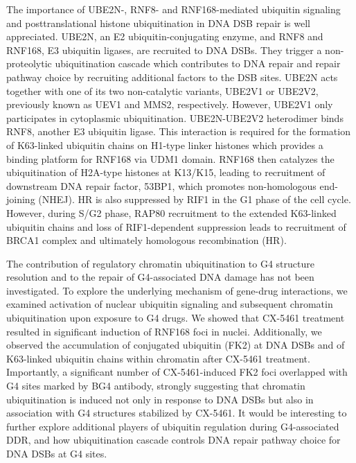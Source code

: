 The importance of UBE2N-, RNF8- and RNF168-mediated ubiquitin signaling and posttranslational histone ubiquitination in DNA DSB repair is well appreciated.  UBE2N, an E2 ubiquitin-conjugating enzyme, and RNF8 and RNF168, E3 ubiquitin ligases, are recruited to DNA DSBs\cite{Kolas2007,Mailand2007,Huen2008,Stewart2009}. 
They trigger a non-proteolytic ubiquitination cascade which contributes to DNA repair and repair pathway choice by recruiting additional factors to the DSB sites. UBE2N acts together with one of its two non-catalytic variants, UBE2V1 or UBE2V2, previously known as UEV1 and MMS2, respectively\cite{Hofmann1999a,Hodge2016c}. However, UBE2V1 only participates in cytoplasmic ubiquitination. UBE2N-UBE2V2 heterodimer binds RNF8, another E3 ubiquitin ligase. This interaction is required for the formation of K63-linked ubiquitin chains on H1-type linker histones which provides a binding platform for RNF168 via UDM1 domain\cite{Hofmann2001,Eddins2006,Kolas2007,Campbell2012,Thorslund2015}. RNF168 then catalyzes the ubiquitination of H2A-type histones at K13/K15, leading to recruitment of downstream DNA repair factor, 53BP1, which promotes non-homologous end-joining (NHEJ)\cite{Gatti2012a,Mattiroli2012,Fradet-Turcotte2013a}. HR is also suppressed by RIF1 in the G1 phase of the cell cycle. However, during S/G2 phase, RAP80 recruitment to the extended K63-linked ubiquitin chains and loss of RIF1-dependent suppression leads to recruitment of BRCA1 complex and ultimately homologous recombination (HR)\cite{Mailand2007,Gatti2012a,Mattiroli2012}. 

The contribution of regulatory chromatin ubiquitination to G4 structure resolution and to the repair of G4-associated DNA damage has not been investigated. To explore the underlying mechanism of gene-drug interactions, we examined activation of nuclear ubiquitin signaling and subsequent chromatin ubiquitination upon exposure to G4 drugs. We showed that CX-5461 treatment resulted in significant induction of RNF168 foci in nuclei. Additionally, we observed the accumulation of conjugated ubiquitin (FK2) at DNA DSBs and of K63-linked ubiquitin chains within chromatin after CX-5461 treatment. Importantly, a significant number of CX-5461-induced FK2 foci overlapped with G4 sites marked by BG4 antibody, strongly suggesting that chromatin ubiquitination is induced not only in response to DNA DSBs but also in association with G4 structures stabilized by CX-5461. It would be interesting to further explore additional players of ubiquitin regulation during G4-associated DDR, and how ubiquitination cascade controls DNA repair pathway choice for DNA DSBs at G4 sites. 

